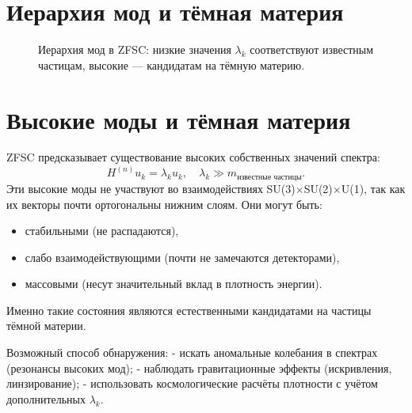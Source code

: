 \documentclass[12pt,a4paper]{article}
\begin{document}
\section{Иерархия мод и тёмная материя}

\begin{figure}[h!]
\centering
{}
\caption{Иерархия мод в ZFSC: низкие значения $\lambda_k$ соответствуют известным частицам, высокие --- кандидатам на тёмную материю.}
\end{figure}

\section{Высокие моды и тёмная материя}
ZFSC предсказывает существование высоких собственных значений спектра:
\[
H^{(n)} u_k = \lambda_k u_k, \quad \lambda_k \gg m_{\text{известные частицы}}.
\]
Эти высокие моды не участвуют во взаимодействиях SU(3)$\times$SU(2)$\times$U(1), так как их векторы почти ортогональны нижним слоям.
Они могут быть:
\begin{itemize}
  \item стабильными (не распадаются),
  \item слабо взаимодействующими (почти не замечаются детекторами),
  \item массовыми (несут значительный вклад в плотность энергии).
\end{itemize}
Именно такие состояния являются естественными кандидатами на частицы тёмной материи.

Возможный способ обнаружения:
- искать аномальные колебания в спектрах (резонансы высоких мод);
- наблюдать гравитационные эффекты (искривления, линзирование);
- использовать космологические расчёты плотности с учётом дополнительных $\lambda_k$.
\end{document}
